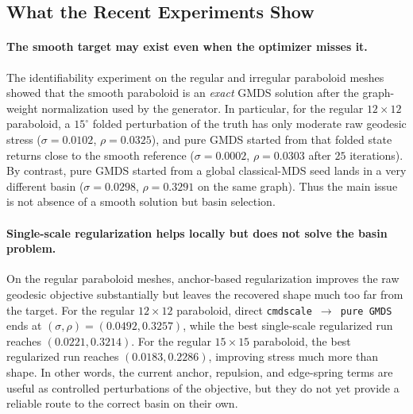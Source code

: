 \documentclass[twoside,11pt]{article}
\begin{document}
\subsection{What the Recent Experiments Show}
\label{sec:recent_experiments}

\paragraph{The smooth target may exist even when the optimizer misses it.}
The identifiability experiment on the regular and irregular paraboloid meshes
showed that the smooth paraboloid is an \emph{exact} GMDS solution after the
graph-weight normalization used by the generator.  In particular, for the
regular $12\times 12$ paraboloid, a $15^\circ$ folded perturbation of the
truth has only moderate raw geodesic stress
($\sigma = 0.0102$, $\rho = 0.0325$), and pure GMDS started from that folded
state returns close to the smooth reference
($\sigma = 0.0002$, $\rho = 0.0303$ after $25$ iterations).  By contrast,
pure GMDS started from a global classical-MDS seed lands in a very different
basin ($\sigma = 0.0298$, $\rho = 0.3291$ on the same graph).  Thus the main
issue is not absence of a smooth solution but basin selection.

\paragraph{Single-scale regularization helps locally but does not solve the
basin problem.}
On the regular paraboloid meshes, anchor-based regularization improves the raw
geodesic objective substantially but leaves the recovered shape much too far
from the target.  For the regular $12\times 12$ paraboloid, direct
\texttt{cmdscale $\rightarrow$ pure GMDS} ends at
$(\sigma,\rho)=(0.0492, 0.3257)$, while the best single-scale regularized run
reaches $(0.0221, 0.3214)$.  For the regular $15\times 15$ paraboloid, the
best regularized run reaches $(0.0183, 0.2286)$, improving stress much more
than shape.  In other words, the current anchor, repulsion, and edge-spring
terms are useful as controlled perturbations of the objective, but they do not
yet provide a reliable route to the correct basin on their own.
\end{document}
